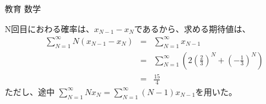 \documentclass[fleqn]{jbook}
\begin{document}
\begin{answer}{教育 数学}{}
\begin{subanswers}
\begin{subsubanswers}
\SubSubAnswer
N回目におわる確率は、$x_{N-1}-x_N$であるから、求める期待値は、
\begin{eqnarray*}
\sum_{N=1}^{\infty}N(x_{N-1}-x_N)&=&\sum_{N=1}^{\infty}x_{N-1}\\
&=&\sum_{N=1}^{\infty}\left(2\left(\frac{2}{3}\right)^N+\left(-\frac{1}{3}\right)^N\right)\\
&=&\frac{15}{4}
\end{eqnarray*}
ただし、途中
$\sum_{N=1}^{\infty}Nx_N=\sum_{N=1}^{\infty}(N-1)x_{N-1}$を用いた。
\end{subsubanswers}

\end{subanswers}

\end{answer}
\end{document}
